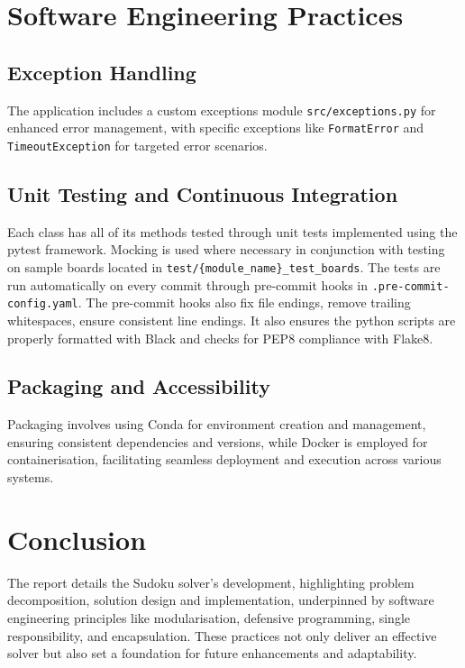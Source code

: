 \documentclass[11pt]{article}
\begin{document}
\section{Software Engineering Practices}

\subsection{Exception Handling}
The application includes a custom exceptions module \texttt{src/exceptions.py} for enhanced error management, with specific exceptions like \texttt{FormatError} and \texttt{TimeoutException} for targeted error scenarios.

\subsection{Unit Testing and Continuous Integration}
Each class has all of its methods tested through unit tests implemented using the pytest framework. Mocking is used where necessary in conjunction with testing on sample boards located in \texttt{test/\{module\_name\}\_test\_boards}. The tests are run automatically on every commit through pre-commit hooks in \texttt{.pre-commit-config.yaml}. The pre-commit hooks also fix file endings, remove trailing whitespaces, ensure consistent line endings. It also ensures the python scripts are properly formatted with Black and checks for PEP8 compliance with Flake8.

\subsection{Packaging and Accessibility}
Packaging involves using Conda for environment creation and management, ensuring consistent dependencies and versions, while Docker is employed for containerisation, facilitating seamless deployment and execution across various systems.

\section{Conclusion}
The report details the Sudoku solver's development, highlighting problem decomposition, solution design and implementation, underpinned by software engineering principles like modularisation, defensive programming, single responsibility, and encapsulation. These practices not only deliver an effective solver but also set a foundation for future enhancements and adaptability.



\end{document}
